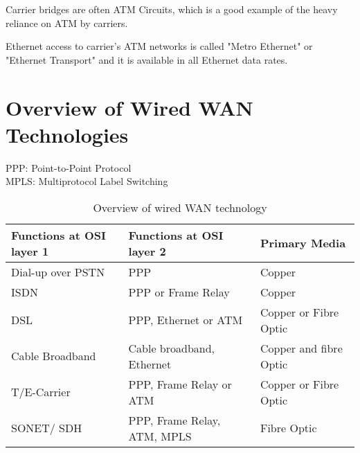 Carrier bridges are often ATM Circuits, which is a good example of the heavy reliance on ATM by carriers.

Ethernet access to carrier's ATM networks is called "Metro Ethernet" or "Ethernet Transport" and it is available in all Ethernet data rates. 

\section*{Overview of Wired WAN Technologies}
PPP: Point-to-Point Protocol\\
MPLS: Multiprotocol Label Switching
\begin{table}[H]
    \centering
    \begin{tabularx}{\textwidth}{XXX}
        \textbf{Functions at OSI layer 1} & \textbf{Functions at OSI layer 2} & \textbf{Primary Media}\\
        \hline
        \hline
        Dial-up over PSTN & PPP & Copper\\
        \hline
        ISDN & PPP or Frame Relay & Copper \\
        \hline
        DSL & PPP, Ethernet or ATM & Copper or Fibre Optic\\
        \hline
        Cable Broadband & Cable broadband, Ethernet & Copper and fibre Optic\\
        \hline
        T/E-Carrier & PPP, Frame Relay or ATM & Copper or Fibre Optic\\
        \hline
        SONET/ SDH & PPP, Frame Relay, ATM, MPLS & Fibre Optic\\
        \hline
    \end{tabularx}
    \caption*{Overview of wired WAN technology}
\end{table}